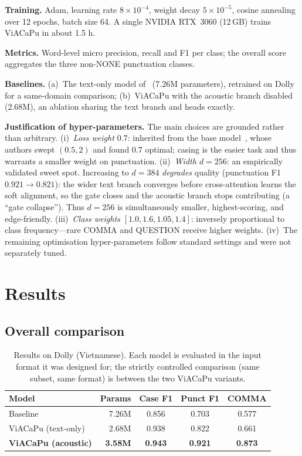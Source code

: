 \documentclass[conference]{IEEEtran}
\begin{document}
\textbf{Training.} Adam, learning rate $8\times10^{-4}$, weight decay
$5\times10^{-5}$, cosine annealing over 12 epochs, batch size 64. A single NVIDIA
RTX~3060 (12\,GB) trains ViACaPu in about 1.5 h.

\textbf{Metrics.} Word-level micro precision, recall and F1 per class; the overall
score aggregates the three non-NONE punctuation classes.

\textbf{Baselines.} (a)~The text-only model of~\cite{you2024lightweight} (7.26M
parameters), retrained on Dolly for a same-domain comparison; (b)~ViACaPu with the
acoustic branch disabled (2.68M), an ablation sharing the text branch and heads
exactly.

\textbf{Justification of hyper-parameters.} The main choices are grounded rather
than arbitrary. (i)~\emph{Loss weight $0.7$}: inherited from the base
model~\cite{you2024lightweight}, whose authors swept $(0.5, 2)$ and found $0.7$
optimal; casing is the easier task and thus warrants a smaller weight on
punctuation. (ii)~\emph{Width $d=256$}: an empirically validated sweet spot.
Increasing to $d=384$ \emph{degrades} quality (punctuation F1 $0.921 \rightarrow
0.821$): the wider text branch converges before cross-attention learns the soft
alignment, so the gate closes and the acoustic branch stops contributing (a ``gate
collapse''). Thus $d=256$ is simultaneously smaller, highest-scoring, and
edge-friendly. (iii)~\emph{Class weights $[1.0,1.6,1.05,1.4]$}: inversely
proportional to class frequency---rare COMMA and QUESTION receive higher weights.
(iv)~The remaining optimisation hyper-parameters follow standard settings and were
not separately tuned.

\section{Results}
\label{sec:results}

\subsection{Overall comparison}

\begin{table}[t]
\caption{Results on Dolly (Vietnamese). Each model is evaluated in the input format
it was designed for; the strictly controlled comparison (same subset, same format)
is between the two ViACaPu variants.}
\label{tab:main}
\centering
\small
\setlength{\tabcolsep}{4pt}
\begin{tabular}{lrccc}
\toprule
Model & Params & Case F1 & Punct F1 & COMMA \\
\midrule
Baseline~\cite{you2024lightweight}   & 7.26M & 0.856 & 0.703 & 0.577 \\
ViACaPu (text-only)                  & 2.68M & 0.938 & 0.822 & 0.661 \\
\textbf{ViACaPu (acoustic)}          & \textbf{3.58M} & \textbf{0.943} & \textbf{0.921} & \textbf{0.873} \\
\bottomrule
\end{tabular}
\end{table}
\end{document}
